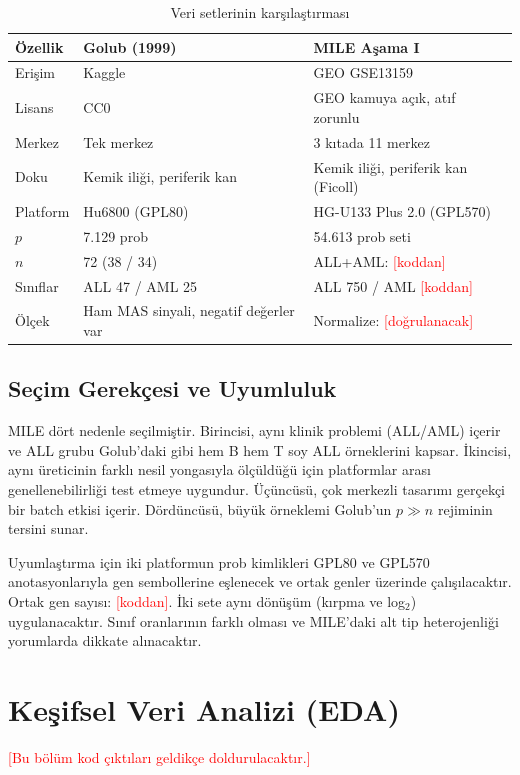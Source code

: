 \documentclass[conference]{IEEEtran}
\newcommand{\todo}[1]{\textcolor{red}{[#1]}}
\begin{document}
\begin{table}[htbp]
\caption{Veri setlerinin karşılaştırması}
\label{tab:veri}
\centering
\footnotesize
\begin{tabularx}{\columnwidth}{@{}l L L@{}}
\toprule
Özellik & Golub (1999) & MILE Aşama I \\
\midrule
Erişim & Kaggle & GEO GSE13159 \\
Lisans & CC0 & GEO kamuya açık, atıf zorunlu \\
Merkez & Tek merkez & 3 kıtada 11 merkez \\
Doku & Kemik iliği, periferik kan & Kemik iliği, periferik kan (Ficoll) \\
Platform & Hu6800 (GPL80) & HG-U133 Plus 2.0 (GPL570) \\
$p$ & 7.129 prob & 54.613 prob seti \\
$n$ & 72 (38 / 34) & ALL+AML: \todo{koddan} \\
Sınıflar & ALL 47 / AML 25 & ALL 750 / AML \todo{koddan} \\
Ölçek & Ham MAS sinyali, negatif değerler var & Normalize: \todo{doğrulanacak} \\
\bottomrule
\end{tabularx}
\end{table}

\subsection{Seçim Gerekçesi ve Uyumluluk}
MILE dört nedenle seçilmiştir. Birincisi, aynı klinik problemi (ALL/AML) içerir ve ALL grubu Golub'daki gibi hem B hem T soy ALL örneklerini kapsar. İkincisi, aynı üreticinin farklı nesil yongasıyla ölçüldüğü için platformlar arası genellenebilirliği test etmeye uygundur. Üçüncüsü, çok merkezli tasarımı gerçekçi bir batch etkisi içerir. Dördüncüsü, büyük örneklemi Golub'un $p \gg n$ rejiminin tersini sunar.

Uyumlaştırma için iki platformun prob kimlikleri GPL80 ve GPL570 anotasyonlarıyla gen sembollerine eşlenecek ve ortak genler üzerinde çalışılacaktır. Ortak gen sayısı: \todo{koddan}. İki sete aynı dönüşüm (kırpma ve log$_2$) uygulanacaktır. Sınıf oranlarının farklı olması ve MILE'daki alt tip heterojenliği yorumlarda dikkate alınacaktır.

\section{Keşifsel Veri Analizi (EDA)}
\todo{Bu bölüm kod çıktıları geldikçe doldurulacaktır.}
\end{document}

